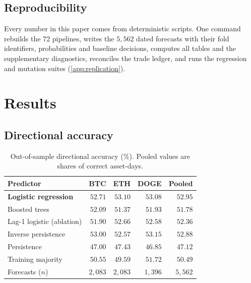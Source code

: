 \documentclass[preprint,12pt,authoryear,a4paper]{elsarticle}
\begin{document}
\subsection{Reproducibility}

Every number in this paper comes from deterministic scripts. One command rebuilds
the 72 pipelines, writes the $5{,}562$ dated forecasts with their fold identifiers,
probabilities and baseline decisions, computes all tables and the supplementary
diagnostics, reconciles the trade ledger, and runs the regression and mutation
suites (\ref{app:replication}).

\section{Results}\label{sec:results}

\subsection{Directional accuracy}

\begin{table}[htbp]\centering\small
\caption{Out-of-sample directional accuracy (\%). Pooled values are shares of
correct asset-days.}
\label{tab:acc}
\begin{tabular}{@{}lrrrr@{}}
\toprule
Predictor & BTC & ETH & DOGE & Pooled \\
\midrule
\textbf{Logistic regression} & $\mathbf{52.71}$ & $\mathbf{53.10}$ & $\mathbf{53.08}$ & $\mathbf{52.95}$ \\
Boosted trees                & $52.09$ & $51.37$ & $51.93$ & $51.78$ \\
Lag-1 logistic (ablation)    & $51.90$ & $52.66$ & $52.58$ & $52.36$ \\
Inverse persistence          & $53.00$ & $52.57$ & $53.15$ & $52.88$ \\
Persistence                  & $47.00$ & $47.43$ & $46.85$ & $47.12$ \\
Training majority            & $50.55$ & $49.59$ & $51.72$ & $50.49$ \\
\midrule
Forecasts ($n$)              & $2{,}083$ & $2{,}083$ & $1{,}396$ & $5{,}562$ \\
\bottomrule
\end{tabular}
\end{table}
\end{document}
